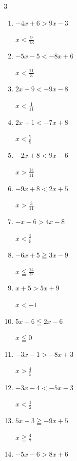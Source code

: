 \begin{multicols}{3}
\begin{enumerate}
        $\displaystyle x<\frac{3}{4}$

  \item $-4x+6>9x-3$

        $\displaystyle x<\frac{9}{13}$

  \item $-5x-5<-8x+6$

        $\displaystyle x<\frac{11}{3}$

\columnbreak %

\resetques

  \item $2x-9<-9x-8$

        $\displaystyle x<\frac{1}{11}$

  \item $2x+1<-7x+8$

        $\displaystyle x<\frac{7}{9}$

  \item $-2x+8<9x-6$

        $\displaystyle x>\frac{14}{11}$

  \item $-9x+8<2x+5$

        $\displaystyle x>\frac{3}{11}$

  \item $-x-6>4x-8$

        $\displaystyle x<\frac{2}{5}$

  \item $-6x+5\geqq 3x-9$

        $\displaystyle x\leqq \frac{14}{9}$

  \item $x+5>5x+9$

        $\displaystyle x<-1$

  \item $5x-6\leqq 2x-6$

        $\displaystyle x\leqq 0$

  \item $-3x-1>-8x+3$

        $\displaystyle x>\frac{4}{5}$

  \item $-3x-4<-5x-3$

        $\displaystyle x<\frac{1}{2}$

  \item $5x-3\geqq -9x+5$

        $\displaystyle x\geqq \frac{4}{7}$

  \item $-5x-6>8x+6$


\end{enumerate}
\end{multicols}
